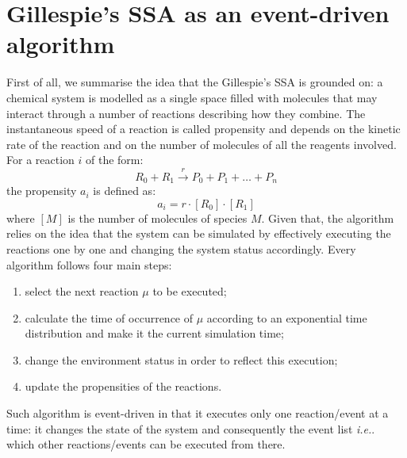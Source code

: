 \documentclass[12pt,a4paper,twoside,openright]{book}
\begin{document}
\section{Gillespie's SSA as an event-driven algorithm}
First of all, we summarise the idea that the Gillespie's SSA is grounded on:
%
a chemical system is modelled as a single space filled with molecules that may interact through a number of reactions describing how they combine. 
%
The instantaneous speed of a reaction is called propensity and depends on the kinetic  rate of the reaction and on the number of molecules of all the reagents involved. 
%
For a reaction $i$ of the form:
$$ R_0 + R_1 \xrightarrow{r} P_0 + P_1 + \ldots + P_n$$
the propensity $a_i$ is defined as:
$$ a_i = r\cdot [R_0] \cdot [R_1] $$
where $[M]$ is the number of molecules of species $M$.
%
Given that, the algorithm relies on the idea that the system can be simulated by effectively executing the reactions one by one and changing the system status accordingly. 
%
Every algorithm follows four main steps:
%
\begin{enumerate}
	\item select the next reaction $\mu$ to be executed;
	\item calculate the time of occurrence of $\mu$ according to an exponential time distribution and make it the current simulation time;
	\item change the environment status in order to reflect this execution;
	\item update the propensities of the reactions.
\end{enumerate}
%
Such algorithm is event-driven in that it executes only one reaction/event at a time: it changes the state of the system and consequently the event list \emph{i.e.}. which other reactions/events can be executed from there.

\end{document}
